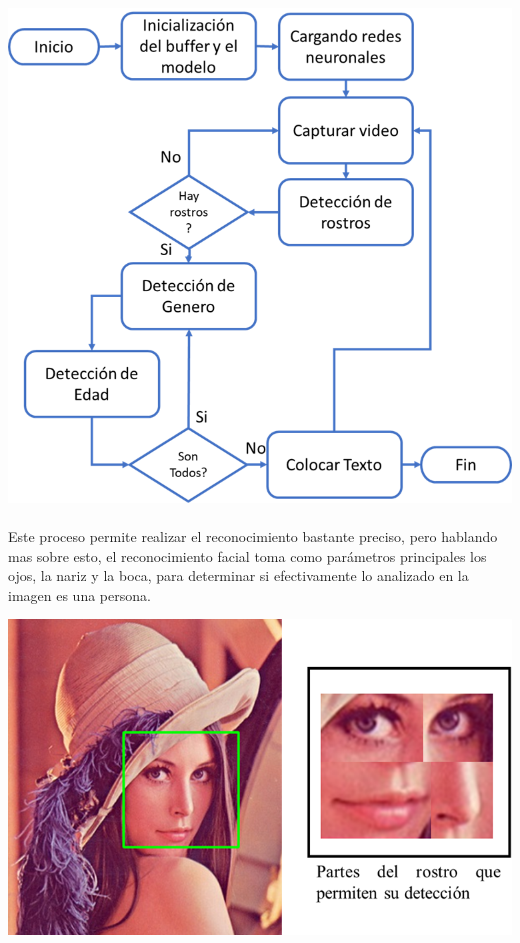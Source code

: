 \documentclass[9pt]{report}
\newenvironment{Figura}
  {\par\medskip\noindent\minipage{\linewidth}}
  {\endminipage\par\medskip}
\begin{document}
\begin{multicols}{2}
	\paragraph{}
	\begin{Figura}
		\includegraphics[width=\textwidth]{1}
		\label{figura2}
	\end{Figura}
	\paragraph{}
	Este proceso permite realizar el reconocimiento bastante preciso, pero hablando mas sobre esto, el reconocimiento facial toma como parámetros principales los ojos, la nariz y la boca, para determinar si efectivamente lo analizado en la imagen es una persona.
	\begin{Figura}
		\includegraphics[width=\textwidth]{2}
		\label{figura3}
	\end{Figura}

\end{multicols}
\end{document}
